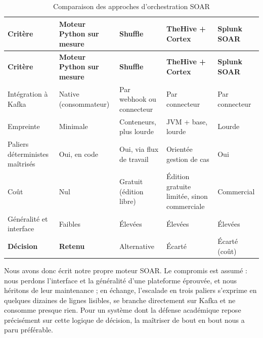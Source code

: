 
\renewcommand{\arraystretch}{1.25}
\small
\begin{xltabular}{\textwidth}{|>{\raggedright\arraybackslash}X|>{\raggedright\arraybackslash}X|>{\raggedright\arraybackslash}X|>{\raggedright\arraybackslash}X|>{\raggedright\arraybackslash}X|}

\caption{Comparaison des approches d'orchestration SOAR}
\label{tab:soar} \\

\hline
{}
\textbf{Critère} & \textbf{Moteur Python sur mesure} & \textbf{Shuffle} \cite{shuffle_docs} & \textbf{TheHive + Cortex} \cite{thehive_docs} & \textbf{Splunk SOAR} \\ \hline
\endfirsthead

\hline
{}
\textbf{Critère} & \textbf{Moteur Python sur mesure} & \textbf{Shuffle} \cite{shuffle_docs} & \textbf{TheHive + Cortex} \cite{thehive_docs} & \textbf{Splunk SOAR} \\ \hline
\endhead

Intégration à Kafka & Native (consommateur) & Par webhook ou connecteur & Par connecteur & Par connecteur \\ \hline
Empreinte & Minimale & Conteneurs, plus lourde & JVM + base, lourde & Lourde \\ \hline
Paliers déterministes maîtrisés & Oui, en code & Oui, via flux de travail & Orientée gestion de cas & Oui \\ \hline
Coût & Nul & Gratuit (édition libre) & Édition gratuite limitée, sinon commerciale & Commercial \\ \hline
Généralité et interface & Faibles & Élevées & Élevées & Élevées \\ \hline
\textbf{Décision} & \textbf{Retenu} & Alternative & Écarté & Écarté (coût) \\ \hline

\end{xltabular}


Nous avons donc écrit notre propre moteur SOAR. Le compromis est assumé : nous perdons l'interface et la généralité d'une plateforme éprouvée, et nous héritons de leur maintenance ; en échange, l'escalade en trois paliers s'exprime en quelques dizaines de lignes lisibles, se branche directement sur Kafka et ne consomme presque rien. Pour un système dont la défense académique repose précisément sur cette logique de décision, la maîtriser de bout en bout nous a paru préférable.

